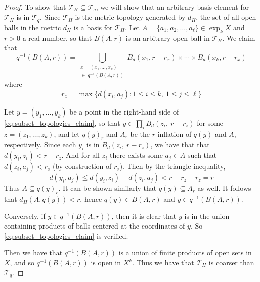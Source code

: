 \documentclass[12pt,twoside]{reedthesis}
\theoremstyle{definition}
\begin{document}
\begin{proof}
  To show that $\mathcal{T}_H \subseteq \mathcal{T}_q$, we will show that an arbitrary basis element for $\mathcal{T}_H$ is in $\mathcal{T}_q$.
  Since $\mathcal{T}_H$ is the metric topology generated by $d_H$, the set of all open balls in the metric $d_H$ is a basis for $\mathcal{T}_H$.
  Let $A = \{ a_1, a_2, \ldots, a_\ell \} \in \exp_k X$ and $r > 0$ a real number, so that $B(A, r)$ is an arbitrary open ball in $\mathcal{T}_H$.
  We claim that
  \begin{equation}\label{eq:subset_topologies_claim}
    q^{-1}(B(A,r)) = \bigcup_{\substack{x = (x_1, \ldots, x_k) \\ \in\ q^{-1}(B(A,r))}} B_d(x_1, r - r_x) \times \cdots \times B_d(x_k, r - r_x)
  \end{equation}
  where
  \begin{equation*}
    r_x = \max \{ d(x_i, a_j) : 1 \leq i \leq k,\ 1 \leq j \leq \ell \}
  \end{equation*}

  Let $y = (y_1, \ldots, y_k)$ be a point in the right-hand side of \eqref{eq:subset_topologies_claim}, so that $y \in \prod_i B_d(z_i,\ r - r_z)$ for some $z = (z_1, \ldots, z_k)$, and let $q(y)_r$ and $A_r$ be the $r$-inflation of $q(y)$ and $A$, respectively.
  Since each $y_i$ is in $B_d(z_i,\ r - r_z)$, we have that that $d(y_i, z_i) < r - r_z$.
  And for all $z_i$ there exists some $a_j \in A$ such that $d(z_i, a_j) < r_z$ (by construction of $r_z$).
  Then by the triangle inequality,
  \begin{equation*}
    d(y_i, a_j) \leq d(y_i, z_i) + d(z_i, a_j) < r - r_z + r_z = r
  \end{equation*}
  Thus $A \subseteq q(y)_r$.
  It can be shown similarly that $q(y) \subseteq A_r$ as well.
  It follows that $d_H(A, q(y)) < r$, hence $q(y) \in B(A,r)$ and $y \in q^{-1}(B(A,r))$. 
  
  Conversely, if $y \in q^{-1}(B(A,r))$, then it is clear that $y$ is in the union containing products of balls centered at the coordinates of $y$.
  So \eqref{eq:subset_topologies_claim} is verified.

  Then we have that $q^{-1}(B(A,r))$ is a union of finite products of open sets in $X$, and so $q^{-1}(B(A, r))$ is open in $X^k$.
  Thus we have that $\mathcal{T}_H$ is coarser than  $\mathcal{T}_q$.


\end{proof}
\end{document}
